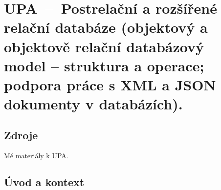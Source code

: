 

\graphicspath{{upa/postrelacni_a_rozsirene_relacni/figures}}


\chapter{UPA~--~Postrelační a rozšířené relační databáze (objektový a objektově relační databázový model -- struktura a operace; podpora práce s XML a JSON dokumenty v databázích).}


\section{Zdroje}

\begin{compactitem}
    \item {}
    \item {}
    \item {}
    \item {}
    \item {}
    \item Mé materiály k UPA.
\end{compactitem}


\section{Úvod a kontext}

